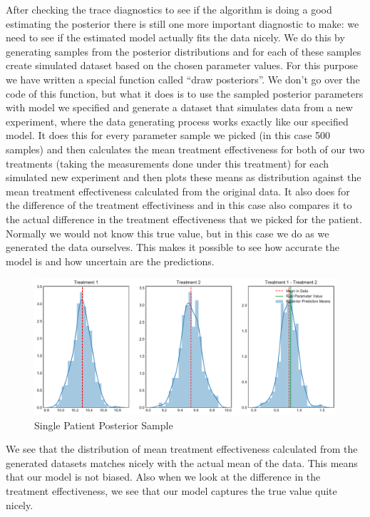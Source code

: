 \documentclass[12pt,a4paper,leqno]{report}
\theoremstyle{plain}
\theoremstyle{definition}
\theoremstyle{remark}
\begin{document}
After checking the trace diagnostics to see if the algorithm is doing a good estimating
the posterior there is still one more important diagnostic to make: we need to see if
the estimated model actually fits the data nicely. We do this by generating samples from
the posterior distributions and for each of these samples create simulated dataset based
on the chosen parameter values. For this purpose we have written a special function
called ``draw posteriors''. We don't go over the code of this function, but what it does is to use the sampled
posterior parameters with model we specified and generate a dataset that simulates data
from a new experiment, where the data generating process works exactly like our
specified model. It does this for every parameter sample we picked (in this case 500
samples) and then calculates the mean treatment effectiveness for both of our two
treatments (taking the measurements done under this treatment) for each simulated new
experiment and then plots these means as distribution against the mean treatment
effectiveness calculated from the original data. It also does for the difference of the
treatment effectiviness and in this case also compares it to the actual difference in
the treatment effectiveness that we picked for the patient. Normally we would not know
this true value, but in this case we do as we generated the data ourselves. This
makes it possible to see how accurate the model is and how uncertain are the predictions.

\begin{figure}[!h]
    \caption{Single Patient Posterior Sample}
    \includegraphics[width=\textwidth,height=\textheight,keepaspectratio]{single_patient_no_trend_posterior_sampling.pdf}
\end{figure}

We see that the distribution of mean treatment effectiveness calculated from the
generated datasets matches nicely with the actual mean of the data. This means that our
model is not biased. Also when we look at the difference in the treatment effectiveness,
we see that our model captures the true value quite nicely.
\end{document}
